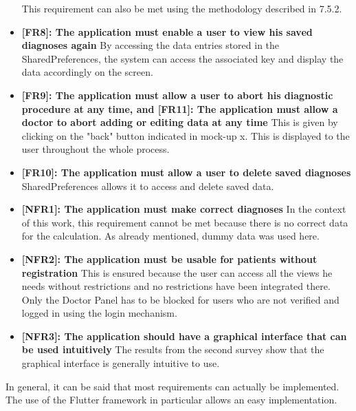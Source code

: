 \begin{itemize}
	\newline
	This requirement can also be met using the methodology described in 7.5.2.
	\item \textbf{[FR8]: The application must enable a user to view his saved diagnoses again}
	\newline
	By accessing the data entries stored in the SharedPreferences, the system can access the associated key and display the data accordingly on the screen.
	\item \textbf{[FR9]: The application must allow a user to abort his diagnostic procedure at any time, and [FR11]: The application must allow a doctor to abort adding or editing data at any time}
	\newline
	This is given by clicking on the "back" button indicated in mock-up x. This is displayed to the user throughout the whole process.
	\item \textbf{[FR10]: The application must allow a user to delete saved diagnoses}
	\newline
	SharedPreferences allows it to access and delete saved data.
	\item \textbf{[NFR1]: The application must make correct diagnoses}
	\newline
	In the context of this work, this requirement cannot be met because there is no correct data for the calculation. As already mentioned, dummy data was used here.
	\item \textbf{[NFR2]: The application must be usable for patients without registration}
	\newline
	This is ensured because the user can access all the views he needs without restrictions and no restrictions have been integrated there. Only the Doctor Panel has to be blocked for users who are not verified and logged in using the login mechanism.
	\item \textbf{[NFR3]: The application should have a graphical interface that can be used intuitively}
	\newline
	The results from the second survey show that the graphical interface is generally intuitive to use.
\end{itemize}
In general, it can be said that most requirements can actually be implemented. The use of the Flutter framework in particular allows an easy implementation.




